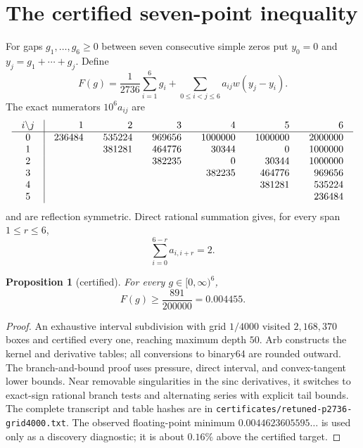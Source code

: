 \documentclass[11pt]{article}
\newtheorem{proposition}[theorem]{Proposition}
\theoremstyle{remark}
\begin{document}
\section{The certified seven-point inequality}\label{sec:certificate}

For gaps $g_1,\ldots,g_6\ge0$ between seven consecutive simple zeros put
$y_0=0$ and $y_j=g_1+\cdots+g_j$.  Define
\begin{equation}\label{eq:F}
F(g)=\frac1{2736}\sum_{i=1}^{6}g_i
+\sum_{0\le i<j\le6}a_{ij}w(y_j-y_i).
\end{equation}
The exact numerators $10^6a_{ij}$ are
\[
\setlength{\arraycolsep}{10pt}
\begin{array}{c|rrrrrr}
i\backslash j&1&2&3&4&5&6\\ \hline
0&236484&535224&969656&1000000&1000000&2000000\\
1&&381281&464776&30344&0&1000000\\
2&&&382235&0&30344&1000000\\
3&&&&382235&464776&969656\\
4&&&&&381281&535224\\
5&&&&&&236484
\end{array}
\]
and are reflection symmetric.  Direct rational summation gives, for every
span $1\le r\le6$,
\begin{equation}\label{eq:capacity}
\sum_{i=0}^{6-r}a_{i,i+r}=2.
\end{equation}

\begin{proposition}[certified]\label{prop:F}
For every $g\in[0,\infty)^6$,
\[
F(g)\ge\frac{891}{200000}=0.004455.
\]
\end{proposition}

\begin{proof}
An exhaustive interval subdivision with grid $1/4000$ visited
$2{,}168{,}370$ boxes and certified every one, reaching maximum depth $50$.
Arb constructs the kernel and derivative tables; all conversions to binary64
are rounded outward.  The branch-and-bound proof uses pressure, direct
interval, and convex-tangent lower bounds.  Near removable singularities in
the sinc derivatives, it switches to exact-sign rational branch tests and
alternating series with explicit tail bounds.  The complete transcript and
table hashes are in
\texttt{certificates/retuned-p2736-grid4000.txt}.  The observed floating-point
minimum $0.0044623605595\ldots$ is used only as a discovery diagnostic; it is
about $0.16\%$ above the certified target.
\end{proof}
\end{document}
